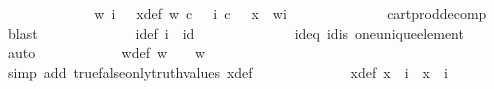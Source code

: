\begin{isabellebody}
\ \ \ \ \ \ \ \ \ \ \isamarkupfalse%
\ \isamarkupfalse%
\ w\ i\ \ \ x{\isacharunderscore}{\kern0pt}def{\isacharcolon}{\kern0pt}\ {\isachardoublequoteopen}{\isacharparenleft}{\kern0pt}w\ {\isasymin}\isactrlsub c\ {\isasymOmega}{\isacharparenright}{\kern0pt}\ {\isasymand}\ {\isacharparenleft}{\kern0pt}i\ {\isasymin}\isactrlsub c\ {\isasymone}{\isacharparenright}{\kern0pt}\ {\isasymand}\ {\isacharparenleft}{\kern0pt}x\ {\isacharequal}{\kern0pt}\ {\isasymlangle}w{\isacharcomma}{\kern0pt}i{\isasymrangle}{\isacharparenright}{\kern0pt}{\isachardoublequoteclose}\isanewline
\ \ \ \ \ \ \ \ \ \ \ \ \isamarkupfalse%
\ cart{\isacharunderscore}{\kern0pt}prod{\isacharunderscore}{\kern0pt}decomp\ \isamarkupfalse%
\ blast\isanewline
\ \ \ \ \ \ \ \ \ \ \isamarkupfalse%
\ \isamarkupfalse%
\ i{\isacharunderscore}{\kern0pt}def{\isacharcolon}{\kern0pt}\ {\isachardoublequoteopen}i\ {\isacharequal}{\kern0pt}\ id{\isacharparenleft}{\kern0pt}{\isasymone}{\isacharparenright}{\kern0pt}{\isachardoublequoteclose}\isanewline
\ \ \ \ \ \ \ \ \ \ \ \ \isamarkupfalse%
\ id{}{\isacharunderscore}{\kern0pt}eq\ id{}{\isacharunderscore}{\kern0pt}is\ one{\isacharunderscore}{\kern0pt}unique{\isacharunderscore}{\kern0pt}element\ \isamarkupfalse%
\ auto\isanewline
\ \ \ \ \ \ \ \ \ \ \isamarkupfalse%
\ w{\isacharunderscore}{\kern0pt}def{\isacharcolon}{\kern0pt}\ {\isachardoublequoteopen}{\isacharparenleft}{\kern0pt}w\ {\isacharequal}{\kern0pt}\ {\isasymf}{\isacharparenright}{\kern0pt}\ {\isasymor}\ {\isacharparenleft}{\kern0pt}w\ {\isacharequal}{\kern0pt}\ {\isasymt}{\isacharparenright}{\kern0pt}{\isachardoublequoteclose}\isanewline
\ \ \ \ \ \ \ \ \ \ \ \ \isamarkupfalse%
\ {\isacharparenleft}{\kern0pt}simp\ add{\isacharcolon}{\kern0pt}\ true{\isacharunderscore}{\kern0pt}false{\isacharunderscore}{\kern0pt}only{\isacharunderscore}{\kern0pt}truth{\isacharunderscore}{\kern0pt}values\ x{\isacharunderscore}{\kern0pt}def{\isacharparenright}{\kern0pt}\isanewline
\ \ \ \ \ \ \ \ \ \ \isamarkupfalse%
\ \isamarkupfalse%
\ x{\isacharunderscore}{\kern0pt}def{}{\isacharcolon}{\kern0pt}\ {\isachardoublequoteopen}{\isacharparenleft}{\kern0pt}x\ {\isacharequal}{\kern0pt}\ {\isasymlangle}{\isasymf}{\isacharcomma}{\kern0pt}i{\isasymrangle}{\isacharparenright}{\kern0pt}\ {\isasymor}\ {\isacharparenleft}{\kern0pt}x\ {\isacharequal}{\kern0pt}\ {\isasymlangle}{\isasymt}{\isacharcomma}{\kern0pt}i{\isasymrangle}{\isacharparenright}{\kern0pt}{\isachardoublequoteclose}\isanewline

\end{isabellebody}
